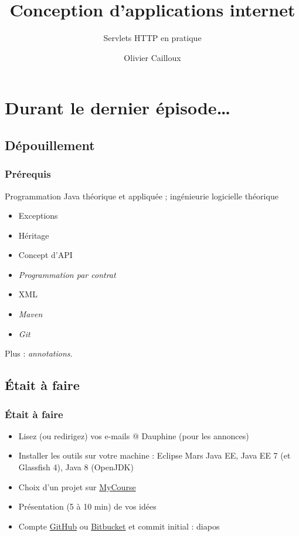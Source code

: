 \documentclass[english, french]{beamer}
\title{Conception d’applications internet}
\subtitle{Servlets HTTP en pratique}
\author{Olivier Cailloux}
\institute[LAMSADE]{LAMSADE, Université Paris-Dauphine}
\date{\formatdate{7}{12}{2015}}
\begin{document}


\begin{frame}[plain]
   \titlepage
\end{frame}
\addtocounter{framenumber}{-1}

\section[Dernier épisode]{Durant le dernier épisode…}
\subsection{Dépouillement}
\begin{frame}
	\frametitle{Prérequis}
	Programmation Java théorique et appliquée ; ingénieurie logicielle théorique
	\begin{itemize}
		\item Exceptions
		\item Héritage
		\item Concept d’API
		\item \emph{Programmation par contrat}
		\item XML
		\item \emph{Maven}
		\item \emph{Git}
	\end{itemize}
	Plus : \emph{annotations}.
\end{frame}

\subsection{Était à faire}
\begin{frame}
	\frametitle{Était à faire}
	\begin{itemize}
		\item Lisez (ou redirigez) vos e-mails @ Dauphine (pour les annonces)
		\item Installer les outils sur votre machine : Eclipse Mars Java EE, Java EE 7 (et Glassfish 4), Java 8 (OpenJDK)
		\item Choix d’un projet sur \href{https://mycourse.dauphine.fr/webapps/blackboard/execute/courseMain?course_id=_34753_1}{MyCourse}
		\item Présentation (5 à 10 min) de vos idées
		\item Compte \href{https://github.com/}{GitHub} ou \href{https://bitbucket.org/}{Bitbucket} et commit initial : diapos
	\end{itemize}
\end{frame}
\end{document}
